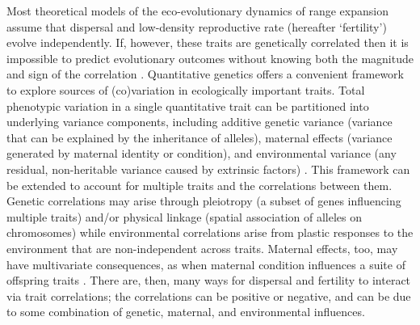 \documentclass[11pt]{article}
\begin{document}
Most theoretical models of the eco-evolutionary dynamics of range expansion assume that dispersal and low-density reproductive rate (hereafter `fertility') evolve independently.
If, however, these traits are genetically correlated then it is impossible to predict evolutionary outcomes without knowing both the magnitude and sign of the correlation \citep{lande_measurement_1983,chenoweth2010contribution}.
Quantitative genetics offers a convenient framework to explore sources of (co)variation in ecologically important traits.
Total phenotypic variation in a single quantitative trait can be partitioned into underlying variance components, including additive genetic variance (variance that can be explained by the inheritance of alleles), maternal effects (variance generated by maternal identity or condition), and environmental variance (any residual, non-heritable variance caused by extrinsic factors) \citep{lynch_genetics_1998,kruuk_estimating_2004,wilson_ecologists_2010}.
This framework can be extended to account for multiple traits and the correlations between them.
Genetic correlations may arise through pleiotropy (a subset of genes influencing multiple traits) and/or physical linkage (spatial association of alleles on chromosomes) \citep{roff_evolutionary_1997} while environmental correlations arise from plastic responses to the environment that are non-independent across traits.
Maternal effects, too, may have multivariate consequences, as when maternal condition influences a suite of offspring traits \citep{thiede1998maternal,wilson2005maternal}. 
There are, then, many ways for dispersal and fertility to interact via trait correlations; the correlations can be positive or negative, and can be due to some combination of genetic, maternal, and environmental influences.
\end{document}
